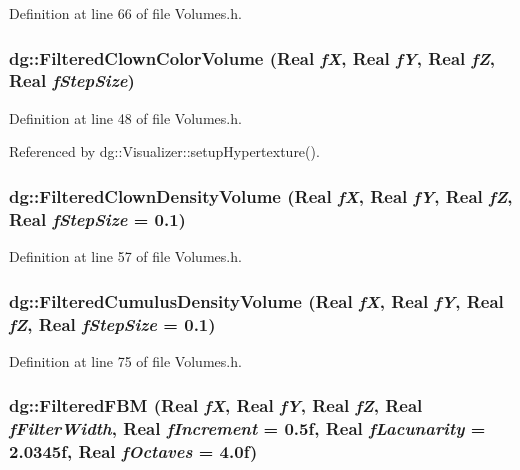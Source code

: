 Definition at line 66 of file Volumes.h.
\subsubsection{ dg::Filtered\-Clown\-Color\-Volume ({\bf Real} {\em f\-X}, {\bf Real} {\em f\-Y}, {\bf Real} {\em f\-Z}, {\bf Real} {\em f\-Step\-Size})\hspace{0.3cm}{\tt  [inline]}}\label{namespacedg_a189}




Definition at line 48 of file Volumes.h.

Referenced by dg::Visualizer::setup\-Hypertexture().
\subsubsection{ dg::Filtered\-Clown\-Density\-Volume ({\bf Real} {\em f\-X}, {\bf Real} {\em f\-Y}, {\bf Real} {\em f\-Z}, {\bf Real} {\em f\-Step\-Size} = 0.1)\hspace{0.3cm}{\tt  [inline]}}\label{namespacedg_a201}




Definition at line 57 of file Volumes.h.
\subsubsection{ dg::Filtered\-Cumulus\-Density\-Volume ({\bf Real} {\em f\-X}, {\bf Real} {\em f\-Y}, {\bf Real} {\em f\-Z}, {\bf Real} {\em f\-Step\-Size} = 0.1)\hspace{0.3cm}{\tt  [inline]}}\label{namespacedg_a203}




Definition at line 75 of file Volumes.h.
\subsubsection{ dg::Filtered\-FBM ({\bf Real} {\em f\-X}, {\bf Real} {\em f\-Y}, {\bf Real} {\em f\-Z}, {\bf Real} {\em f\-Filter\-Width}, {\bf Real} {\em f\-Increment} = 0.5f, {\bf Real} {\em f\-Lacunarity} = 2.0345f, {\bf Real} {\em f\-Octaves} = 4.0f)}\label{namespacedg_a137}




